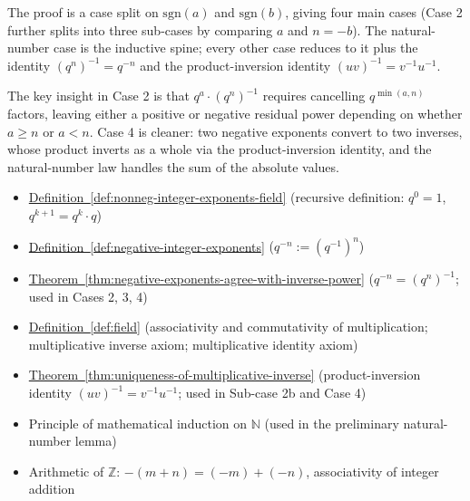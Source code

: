 \begin{remark*}
The proof is a case split on $\mathrm{sgn}(a)$ and $\mathrm{sgn}(b)$, giving
four main cases (Case 2 further splits into three sub-cases by comparing $a$
and $n = -b$).  The natural-number case is the inductive spine; every other
case reduces to it plus the identity $(q^n)^{-1} = q^{-n}$ and the
product-inversion identity $(uv)^{-1} = v^{-1}u^{-1}$.

The key insight in Case 2 is that $q^a\cdot(q^n)^{-1}$ requires cancelling
$q^{\min(a,n)}$ factors, leaving either a positive or negative residual power
depending on whether $a\geq n$ or $a < n$.  Case 4 is cleaner: two negative
exponents convert to two inverses, whose product inverts as a whole via the
product-inversion identity, and the natural-number law handles the sum of the
absolute values.
\end{remark*}

\begin{dependencies}
\begin{itemize}
  \item \hyperref[def:nonneg-integer-exponents-field]{Definition~\ref*{def:nonneg-integer-exponents-field}}
        \textnormal{(recursive definition: $q^0=1$, $q^{k+1}=q^k\cdot q$)}
  \item \hyperref[def:negative-integer-exponents]{Definition~\ref*{def:negative-integer-exponents}}
        \textnormal{($q^{-n} := (q^{-1})^n$)}
  \item \hyperref[thm:negative-exponents-agree-with-inverse-power]{Theorem~\ref*{thm:negative-exponents-agree-with-inverse-power}}
        \textnormal{($q^{-n} = (q^n)^{-1}$; used in Cases 2, 3, 4)}
  \item \hyperref[def:field]{Definition~\ref*{def:field}}
        \textnormal{(associativity and commutativity of multiplication;
        multiplicative inverse axiom; multiplicative identity axiom)}
  \item \hyperref[thm:uniqueness-of-multiplicative-inverse]{Theorem~\ref*{thm:uniqueness-of-multiplicative-inverse}}
        \textnormal{(product-inversion identity $(uv)^{-1} = v^{-1}u^{-1}$;
        used in Sub-case 2b and Case 4)}
  \item Principle of mathematical induction on $\mathbb{N}$
        \textnormal{(used in the preliminary natural-number lemma)}
  \item Arithmetic of $\mathbb{Z}$: $-(m+n) = (-m)+(-n)$, associativity of
        integer addition
\end{itemize}
\end{dependencies}

\clearpage
